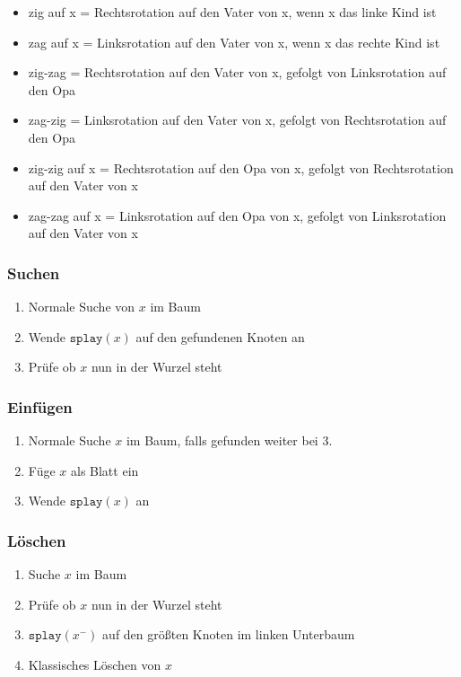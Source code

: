 \documentclass[11pt]{scrartcl}
\begin{document}
\begin{itemize}
	\item zig auf x = Rechtsrotation auf den Vater von x, wenn x das linke Kind ist
    \item zag auf x = Linksrotation auf den Vater von x, wenn x das rechte Kind ist
    \item zig-zag = Rechtsrotation auf den Vater von x, gefolgt von Linksrotation auf den Opa
    \item zag-zig = Linksrotation auf den Vater von x, gefolgt von Rechtsrotation auf den Opa
    \item zig-zig auf x = Rechtsrotation auf den Opa von x, gefolgt von Rechtsrotation auf den Vater von x
    \item zag-zag auf x = Linksrotation auf den Opa von x, gefolgt von Linksrotation auf den Vater von x
\end{itemize}

\subsubsection{Suchen}
\begin{enumerate}
	\item Normale Suche von $x$ im Baum
    \item Wende $\texttt{splay}(x)$ auf den gefundenen Knoten an
    \item Prüfe ob $x$ nun in der Wurzel steht
\end{enumerate}

\subsubsection{Einfügen}
\begin{enumerate}
	\item Normale Suche $x$ im Baum, falls gefunden weiter bei 3.
    \item Füge $x$ als Blatt ein
    \item Wende $\texttt{splay}(x)$ an
\end{enumerate}

\subsubsection{Löschen}
\begin{enumerate}
	\item Suche $x$ im Baum
    \item Prüfe ob $x$ nun in der Wurzel steht
    \item $\texttt{splay}(x^-)$ auf den größten Knoten im linken Unterbaum
    \item Klassisches Löschen von $x$
\end{enumerate}
\end{document}

